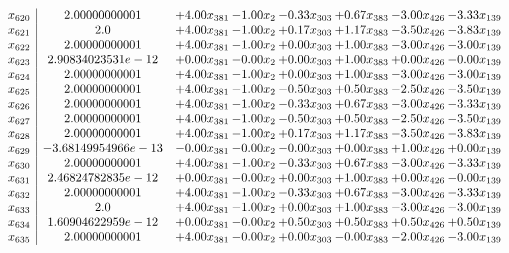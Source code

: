\documentclass[8pt]{article}
\begin{document}
\[\begin{array}{c| c c@{\hskip 2pt} c@{\hskip 2pt} c@{\hskip 2pt} c@{\hskip 2pt} c@{\hskip 2pt} c@{\hskip 2pt} }
 x_{620}   &  2.00000000001 & +  4.00 x_{381} & -1.00 x_{2} & -0.33 x_{303} & +  0.67 x_{383} & -3.00 x_{426} & -3.33 x_{139}\\
 x_{621}   &  2.0 & +  4.00 x_{381} & -1.00 x_{2} & +  0.17 x_{303} & +  1.17 x_{383} & -3.50 x_{426} & -3.83 x_{139}\\
 x_{622}   &  2.00000000001 & +  4.00 x_{381} & -1.00 x_{2} & +  0.00 x_{303} & +  1.00 x_{383} & -3.00 x_{426} & -3.00 x_{139}\\
 x_{623}   &  2.90834023531e-12 & +  0.00 x_{381} & -0.00 x_{2} & +  0.00 x_{303} & +  1.00 x_{383} & +  0.00 x_{426} & -0.00 x_{139}\\
 x_{624}   &  2.00000000001 & +  4.00 x_{381} & -1.00 x_{2} & +  0.00 x_{303} & +  1.00 x_{383} & -3.00 x_{426} & -3.00 x_{139}\\
 x_{625}   &  2.00000000001 & +  4.00 x_{381} & -1.00 x_{2} & -0.50 x_{303} & +  0.50 x_{383} & -2.50 x_{426} & -3.50 x_{139}\\
 x_{626}   &  2.00000000001 & +  4.00 x_{381} & -1.00 x_{2} & -0.33 x_{303} & +  0.67 x_{383} & -3.00 x_{426} & -3.33 x_{139}\\
 x_{627}   &  2.00000000001 & +  4.00 x_{381} & -1.00 x_{2} & -0.50 x_{303} & +  0.50 x_{383} & -2.50 x_{426} & -3.50 x_{139}\\
 x_{628}   &  2.00000000001 & +  4.00 x_{381} & -1.00 x_{2} & +  0.17 x_{303} & +  1.17 x_{383} & -3.50 x_{426} & -3.83 x_{139}\\
 x_{629}   &  -3.68149954966e-13 & -0.00 x_{381} & -0.00 x_{2} & -0.00 x_{303} & +  0.00 x_{383} & +  1.00 x_{426} & +  0.00 x_{139}\\
 x_{630}   &  2.00000000001 & +  4.00 x_{381} & -1.00 x_{2} & -0.33 x_{303} & +  0.67 x_{383} & -3.00 x_{426} & -3.33 x_{139}\\
 x_{631}   &  2.46824782835e-12 & +  0.00 x_{381} & -0.00 x_{2} & +  0.00 x_{303} & +  1.00 x_{383} & +  0.00 x_{426} & -0.00 x_{139}\\
 x_{632}   &  2.00000000001 & +  4.00 x_{381} & -1.00 x_{2} & -0.33 x_{303} & +  0.67 x_{383} & -3.00 x_{426} & -3.33 x_{139}\\
 x_{633}   &  2.0 & +  4.00 x_{381} & -1.00 x_{2} & +  0.00 x_{303} & +  1.00 x_{383} & -3.00 x_{426} & -3.00 x_{139}\\
 x_{634}   &  1.60904622959e-12 & +  0.00 x_{381} & -0.00 x_{2} & +  0.50 x_{303} & +  0.50 x_{383} & +  0.50 x_{426} & +  0.50 x_{139}\\
 x_{635}   &  2.00000000001 & +  4.00 x_{381} & -0.00 x_{2} & +  0.00 x_{303} & -0.00 x_{383} & -2.00 x_{426} & -3.00 x_{139}\\

\end{array}\]
\end{document}
